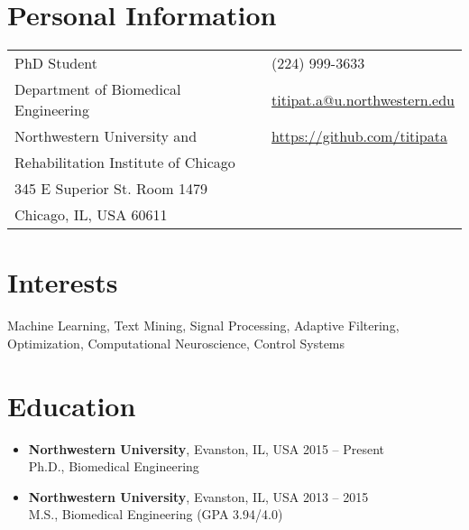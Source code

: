 \documentclass[margin,line]{res}
\def\envelope{{\FA \faEnvelopeO}}
\def\phone{{\FA \faMobilePhone}}
\def\github{{\FA \faGithubAlt}}
\begin{document}

\begin{resume}

\section{\sc Personal Information}
\vspace{.05in}
\begin{tabular}{@{}p{3.5in}p{3in}}
PhD Student	            			 & {\bf\phone} (224) 999-3633 \\
Department of Biomedical Engineering & {\envelope } \href{mailto:titipat.a@u.northwestern.edu}{titipat.a@u.northwestern.edu} \\
Northwestern University and    & {\github} \href{https://github.com/titipata}{https://github.com/titipata} \\
Rehabilitation Institute of Chicago  & \\
345 E Superior St. Room 1479 	 & \\
Chicago, IL, USA 60611				 &
\end{tabular}


\section{\sc Interests}

Machine Learning, Text Mining, Signal Processing, Adaptive Filtering, Optimization, Computational Neuroscience, Control Systems



\section{\sc Education}

\begin{itemize}[leftmargin=0cm, label={}]

\item {\bf Northwestern University}, Evanston, IL, USA 			\hfill 2015 -- Present \\
Ph.D., Biomedical Engineering

\item {\bf Northwestern University}, Evanston, IL, USA 			\hfill 2013 -- 2015 \\
M.S., Biomedical Engineering 					\hfill (GPA 3.94/4.0)


\end{itemize}
\end{resume}
\end{document}
